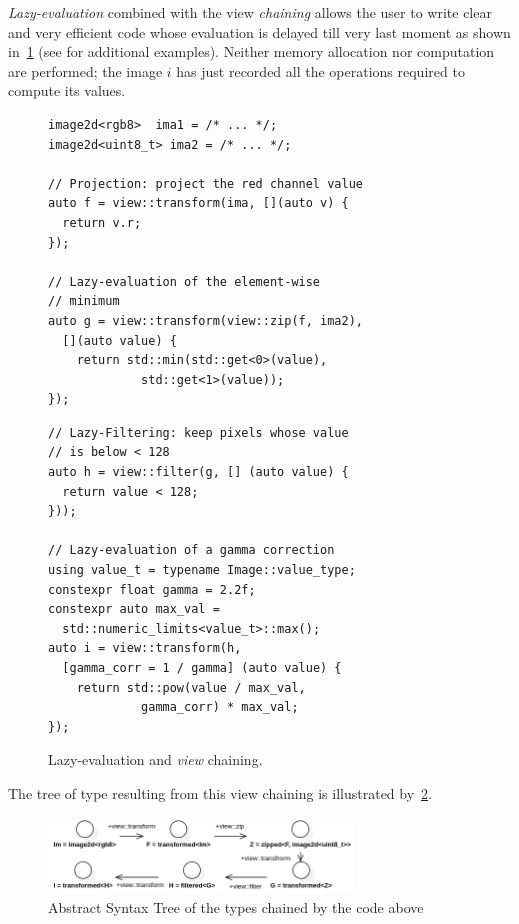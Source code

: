 \emph{Lazy-evaluation} combined with the view \emph{chaining} allows the user to write clear and very efficient code
whose evaluation is delayed till very last moment as shown in~\cref{fig.lazy} (see \cite{geraud.2018.gtgdmm} for
additional examples). Neither memory allocation nor computation are performed; the image $i$ has just recorded all the
operations required to compute its values.

\begin{figure}[htbp]
  \begin{minipage}[l]{0.48\linewidth}
    \begin{verbatim}
image2d<rgb8>  ima1 = /* ... */;
image2d<uint8_t> ima2 = /* ... */;

// Projection: project the red channel value
auto f = view::transform(ima, [](auto v) {
  return v.r;
});

// Lazy-evaluation of the element-wise
// minimum
auto g = view::transform(view::zip(f, ima2),
  [](auto value) {
    return std::min(std::get<0>(value),
             std::get<1>(value));
});
\end{verbatim}
  \end{minipage}
  \hfill
  \begin{minipage}[l]{0.48\linewidth}
    \begin{verbatim}
// Lazy-Filtering: keep pixels whose value
// is below < 128
auto h = view::filter(g, [] (auto value) {
  return value < 128;
}));

// Lazy-evaluation of a gamma correction
using value_t = typename Image::value_type;
constexpr float gamma = 2.2f;
constexpr auto max_val =
  std::numeric_limits<value_t>::max();
auto i = view::transform(h,
  [gamma_corr = 1 / gamma] (auto value) {
    return std::pow(value / max_val,
             gamma_corr) * max_val;
});
\end{verbatim}
  \end{minipage}

  \caption{Lazy-evaluation and \emph{view} chaining.}
  \label{fig.lazy}
\end{figure}

\noindent The tree of type resulting from this view chaining is illustrated by~\cref{fig.viewAST}.

\begin{figure}[htb]
  \includegraphics[height=2cm]{figs/viewAST.png}
  \caption{Abstract Syntax Tree of the types chained by the code above}
  \label{fig.viewAST}
\end{figure}

